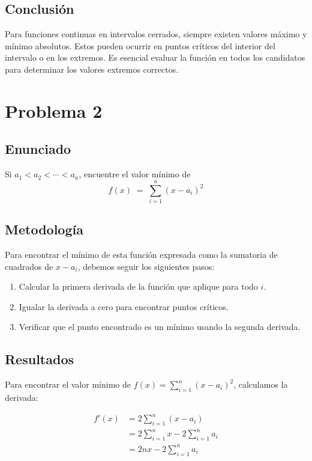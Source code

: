 \documentclass{article}
\begin{document}
\subsection{Conclusión}

Para funciones continuas en intervalos cerrados, siempre existen valores máximo y mínimo absolutos. Estos pueden ocurrir en puntos críticos del interior del intervalo o en los extremos. Es esencial evaluar la función en todos los candidatos para determinar los valores extremos correctos.


\section{Problema 2}

\subsection{Enunciado}
Si $a_{1} < a_{2} < \cdots < a_{n}$, encuentre el valor mínimo de
\[
f(x) \;=\; \sum_{i=1}^{n} (x - a_i)^2
\]

\subsection{Metodología}

Para encontrar el mínimo de esta función expresada como la sumatoria de cuadrados de $x-a_i$, debemos seguir los siguientes pasos:
\begin{enumerate}
    \item Calcular la primera derivada de la función que aplique para todo $i$.
    \item Igualar la derivada a cero para encontrar puntos críticos.
    \item Verificar que el punto encontrado es un mínimo usando la segunda derivada.
\end{enumerate}

\subsection{Resultados}
\setcounter{equation}{0}

Para encontrar el valor mínimo de $f(x) = \sum_{i=1}^{n} (x - a_i)^2$, calculamos la derivada:

\begin{align}
    f'(x) &= 2\sum_{i=1}^{n} (x - a_i) \\
    &= 2\sum_{i=1}^{n} x - 2\sum_{i=1}^{n} a_i \\
    &= 2nx - 2\sum_{i=1}^{n} a_i
\end{align}
\end{document}
